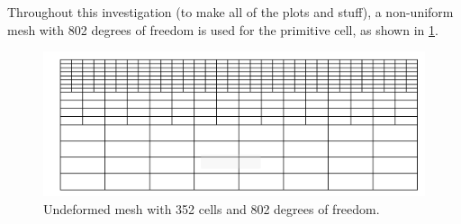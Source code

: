 \documentclass[11pt]{report}
\begin{document}
\begin{appendices}
Throughout this investigation (to make all of the plots and stuff), a non-uniform mesh with 802 degrees of freedom is used for the primitive cell, as shown in \ref{fig:undeformed_mesh_fig}.
\begin{figure}[h]
	\begin{center}
		\includegraphics[scale=0.5]{mesh/undeformed_mesh.png}
	\end{center}
	\captionsetup{format=hang}
	\caption{Undeformed mesh with 352 cells and 802 degrees of freedom.}
	\label{fig:undeformed_mesh_fig}
\end{figure}


\end{appendices}
\end{document}
